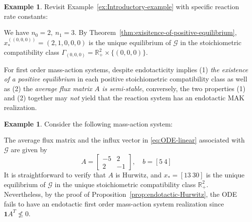 \documentclass[10pt]{amsart}
\numberwithin{equation}{section}
\theoremstyle{plain}
\theoremstyle{definition}
\newtheorem{example}[theorem]{Example}
\theoremstyle{remark}
\newcommand{\cG}{\mathcal{G}}
\begin{document}
\begin{example}\label{ex:degenerate-class}
Revisit Example~\ref{ex:Introductory-example} 
 with specific reaction rate constants: 
\begin{center}
\end{center}
We have $n_0=2,\ n_1=3$. By Theorem~\ref{thm:exisitence-of-positive-equilibrium},  $x_*^{((0,0,0))}=(2,1,0,0,0)$ is the unique equilibrium of $\cG$ in the stoichiometric compatibility class $\Gamma_{(0,0,0)}=\mathbb{R}^2_+\times\{(0,0,0)\}$. 
\end{example}
For first order mass-action systems, despite endotacticity implies (1) \emph{the existence of a positive equilibrium} in each positive stoichiometric compatibility class as well as (2) the 
\emph{average flux matrix $A$ is semi-stable}, conversely,
the two properties (1) and (2) together may \emph{not} yield that the reaction system has an endotactic MAK realization.
\begin{example}
Consider the following mass-action system:
\begin{center}
\end{center}
The average flux matrix and the influx vector in \eqref{eq:ODE-linear} associated with $\cG$ are given by \[A=\begin{bmatrix}
-5&2\\
2&-1
\end{bmatrix},\quad b=[5\ 4]\]
It is straightforward to verify that $A$ is Hurwitz, and $x_*=[13 \ 30]$ is the unique equilibrium of $\cG$ in the unique stoichiometric compatibility class $\mathbb{R}^2_+$. Nevertheless, by the proof of  Proposition~\ref{prop:endotactic-Hurwitz}, the ODE fails to have an endotactic first order mass-action system realization since
$\mathbf{1}A^T\not\le0$.
\end{example}
\end{document}
